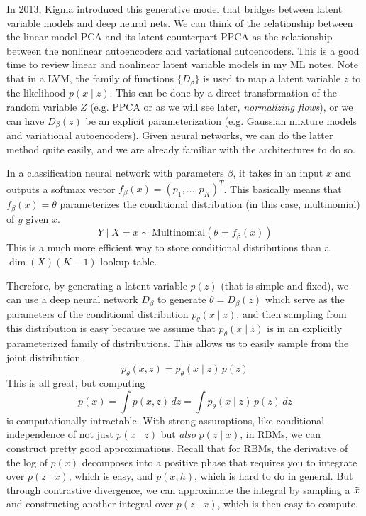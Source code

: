   In 2013, Kigma introduced this generative model that bridges between latent variable models and deep neural nets. We can think of the relationship between the linear model PCA and its latent counterpart PPCA as the relationship between the nonlinear autoencoders and variational autoencoders. This is a good time to review linear and nonlinear latent variable models in my ML notes. Note that in a LVM, the family of functions $\{D_\beta\}$ is used to map a latent variable $z$ to the likelihood $p(x \mid z)$. This can be done by a direct transformation of the random variable $Z$ (e.g. PPCA or as we will see later, \textit{normalizing flows}), or we can have $D_\beta(z)$ be an explicit parameterization (e.g. Gaussian mixture models and variational autoencoders). Given neural networks, we can do the latter method quite easily, and we are already familiar with the architectures to do so. 

  \begin{example}
    In a classification neural network with parameters $\beta$, it takes in an input $x$ and outputs a softmax vector $f_\beta (x) =(p_1, \ldots, p_K)^T$. This basically means that $f_\beta (x) = \theta$ parameterizes the conditional distribution (in this case, multinomial) of $y$ given $x$. 
    \begin{equation}
      Y \mid X = x \sim \mathrm{Multinomial}(\theta = f_\beta (x))
    \end{equation}
    This is a much more efficient way to store conditional distributions than a $\dim(X) (K - 1)$ lookup table. 
  \end{example}

  Therefore, by generating a latent variable $p(z)$ (that is simple and fixed), we can use a deep neural network $D_\beta$ to generate $\theta = D_\beta (z)$ which serve as the parameters of the conditional distribution $p_\theta (x \mid z)$, and then sampling from this distribution is easy because we assume that $p_\theta (x \mid z)$ is in an explicitly parameterized family of distributions. This allows us to easily sample from the joint distribution. 
  \begin{equation}
    p_\theta (x, z) = p_\theta (x \mid z) \, p(z)
  \end{equation}
  This is all great, but computing 
  \begin{equation}
    p(x) = \int p(x, z) \,dz = \int p_\theta (x \mid z) \, p(z) \,dz
  \end{equation}
  is computationally intractable. With strong assumptions, like conditional independence of not just $p(x \mid z)$ but \textit{also} $p(z \mid x)$, in RBMs, we can construct pretty good approximations. Recall that for RBMs, the derivative of the log of $p(x)$ decomposes into a positive phase that requires you to integrate over $p(z \mid x)$, which is easy, and $p(x, h)$, which is hard to do in general. But through contrastive divergence, we can approximate the integral by sampling a $\Tilde{x}$ and constructing another integral over $p(z \mid x)$, which is then easy to compute. 

